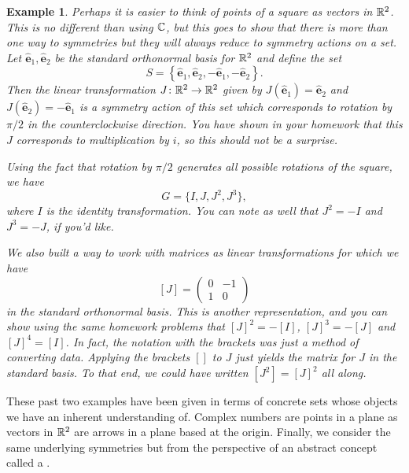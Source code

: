 \documentclass{article}
\theoremstyle{indented}
\newtheorem{example}{Example}
\newcommand{\evec}{\boldsymbol{\hat{e}}}
\begin{document}
\begin{example}
\label{ex:square_r2}
Perhaps it is easier to think of points of a square as vectors in $\mathbb{R}^2$. This is no different than using $\mathbb{C}$, but this goes to show that there is more than one way to  symmetries but they will always reduce to symmetry actions on a set. Let $\evec_1,\evec_2$ be the standard orthonormal basis for $\mathbb{R}^2$ and define the set
\[
S= \left\{\evec_1,\evec_2, -\evec_1, -\evec_2 \right\}.
\]
Then the linear transformation $J\colon \mathbb{R}^2 \to \mathbb{R}^2$ given by $J(\evec_1)=\evec_2$ and $J(\evec_2)=-\evec_1$ is a symmetry action of this set which corresponds to rotation by $\pi/2$ in the counterclockwise direction. You have shown in your homework that this $J$ corresponds to multiplication by $i$, so this should not be a surprise.

Using the fact that rotation by $\pi/2$ generates all possible rotations of the square, we have
\[
G=\{I,J,J^2,J^3\},
\]
where $I$ is the identity transformation. You can note as well that $J^2=-I$ and $J^3=-J$, if you'd like.

We also built a way to work with matrices as linear transformations for which we have
\[
[J] = \begin{pmatrix} 0 & -1 \\ 1 & 0 \end{pmatrix}
\]
in the standard orthonormal basis. This is another representation, and you can show using the same homework problems that $[J]^2=-[I]$, $[J]^3=-[J]$ and $[J]^4 = [I]$. In fact, the notation with the brackets was just a method of converting data. Applying the brackets $[]$ to $J$ just yields the matrix for $J$ in the standard basis. To that end, we could have written $[J^2]=[J]^2$ all along.
\end{example}

These past two examples have been given in terms of concrete sets whose objects we have an inherent understanding of. Complex numbers are points in a plane as vectors in $\mathbb{R}^2$ are arrows in a plane based at the origin. Finally, we consider the same underlying symmetries but from the perspective of an abstract concept called a .
\end{document}
